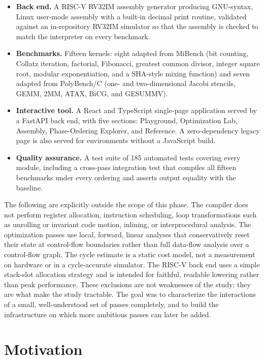 \begin{itemize}
  \item \textbf{Back end.} A RISC-V RV32IM assembly generator producing GNU-syntax, Linux user-mode assembly with a built-in decimal print routine, validated against an in-repository RV32IM simulator so that the assembly is checked to match the interpreter on every benchmark.
  \item \textbf{Benchmarks.} Fifteen kernels: eight adapted from MiBench (bit counting, Collatz iteration, factorial, Fibonacci, greatest common divisor, integer square root, modular exponentiation, and a SHA-style mixing function) and seven adapted from PolyBench/C (one- and two-dimensional Jacobi stencils, GEMM, 2MM, ATAX, BiCG, and GESUMMV).
  \item \textbf{Interactive tool.} A React and TypeScript single-page application served by a FastAPI back end, with five sections: Playground, Optimization Lab, Assembly, Phase-Ordering Explorer, and Reference. A zero-dependency legacy page is also served for environments without a JavaScript build.
  \item \textbf{Quality assurance.} A test suite of 185 automated tests covering every module, including a cross-pass integration test that compiles all fifteen benchmarks under every ordering and asserts output equality with the baseline.
\end{itemize}

The following are explicitly outside the scope of this phase. The compiler does not perform register allocation, instruction scheduling, loop transformations such as unrolling or invariant code motion, inlining, or interprocedural analysis. The optimization passes use local, forward, linear analyses that conservatively reset their state at control-flow boundaries rather than full data-flow analysis over a control-flow graph. The cycle estimate is a static cost model, not a measurement on hardware or in a cycle-accurate simulator. The RISC-V back end uses a simple stack-slot allocation strategy and is intended for faithful, readable lowering rather than peak performance. These exclusions are not weaknesses of the study; they are what make the study tractable. The goal was to characterize the interactions of a small, well-understood set of passes completely, and to build the infrastructure on which more ambitious passes can later be added.

\section{Motivation}

